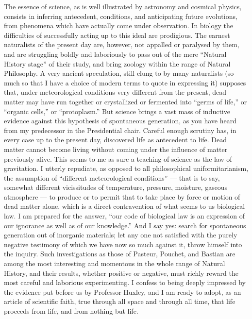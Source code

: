 \documentclass[a4paper, 11pt, oneside, english]{article}
\begin{document}
The essence of science, as is well illustrated by astronomy and cosmical physics, consists in inferring antecedent, conditions, and anticipating future evolutions, from phenomena which have actually come under observation. In biology the difficulties of successfully acting up to this ideal are prodigious. The earnest naturalists of the present day are, however, not appalled or paralysed by them, and are struggling boldly and laboriously to pass out of the mere ``Natural History stage'' of their study, and bring zoology within the range of Natural Philosophy. A very ancient speculation, still clung to by many naturalists (so much so that I have a choice of modern terms to quote in expressing it) supposes that, under meteorological conditions very different from the present, dead matter may have run together or crystallized or fermented into ``germs of life,'' or ``organic cells,'' or ``protoplasm.'' But science brings a vast mass of inductive evidence against this hypothesis of spontaneous generation, as you have heard from my predecessor in the Presidential chair. Careful enough scrutiny has, in every case up to the present day, discovered life as antecedent to life. Dead matter cannot become living without coming under the influence of matter previously alive. This seems to me as sure a teaching of science as the law of gravitation. I utterly repudiate, as opposed to all philosophical uniformitarianism, the assumption of ``different meteorological conditions'' --- that is to say, somewhat different vicissitudes of temperature, pressure, moisture, gaseous atmosphere --- to produce or to permit that to take place by force or motion of dead matter alone, which is a direct contravention of what seems to us biological law. I am prepared for the answer, ``our code of biological law is an expression of our ignorance as well as of our knowledge.'' And I say yes: search for spontaneous generation out of inorganic materials; let any one not satisfied with the purely negative testimony of which we have now so much against it, throw himself into the inquiry. Such investigations as those of Pasteur, Pouchet, and Bastian are among the most interesting and momentous in the whole range of Natural History, and their results, whether positive or negative, must richly reward the most careful and laborious experimenting. I confess to being deeply impressed by the evidence put before us by Professor Huxley, and I am ready to adopt, as an article of scientific faith, true through all space and through all time, that life proceeds from life, and from nothing but life.
\end{document}
